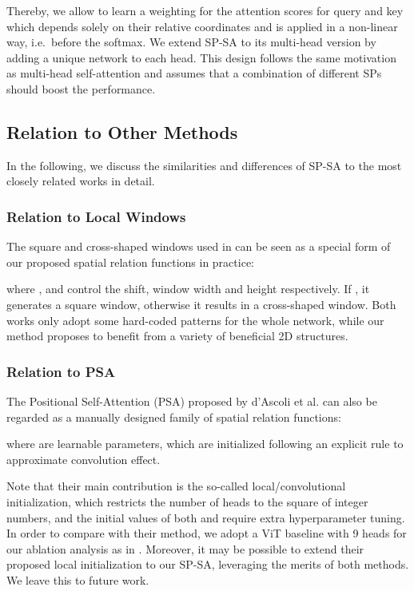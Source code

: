 \documentclass[authorversion, sigconf, acmthm=false, nonacm=true]{acmart}
\begin{document}
Thereby, we allow  to learn a weighting for the attention scores for query  and key  which depends solely on their relative coordinates and is applied in a non-linear way, i.e.~before the softmax.  
We extend SP-SA to its multi-head version by adding a unique network to each head. 
This design follows the same motivation as 
multi-head self-attention and assumes
that a combination of different SPs should boost the performance. 

\subsection{Relation to Other Methods}
In the following, we discuss the similarities and differences of SP-SA to the most closely related works in detail.
\subsubsection{Relation to Local Windows}
The square and cross-shaped windows used in \cite{liu2021swin, dong2021cswin} can be seen as a special form of our proposed spatial relation functions in practice:




\noindent where ,  and  control the shift, window width and height respectively. If , it generates a square window, otherwise it results in a cross-shaped window.
Both works only adopt some hard-coded patterns for the whole network, while our method proposes to benefit from a variety of 
beneficial 2D structures.






 










\subsubsection{Relation to PSA}


The Positional Self-Attention (PSA) proposed by  d’Ascoli et al. \cite{d'ascoli2021convit} can also be regarded as a manually designed family of spatial relation functions:



\noindent where  are learnable parameters, 
which are initialized following an explicit rule to approximate convolution effect.

Note that their main contribution is the so-called local/convolutional initialization, 
which restricts the number of heads to the square of integer numbers, and the initial values of both  and  require extra hyperparameter tuning. 
In order to compare with their method, we adopt a ViT baseline with 9 heads for our ablation analysis as in \cite{d'ascoli2021convit}.
Moreover, it may be possible to extend their proposed local initialization to our SP-SA, 
leveraging the merits of both methods. We leave this to future work.
\end{document}
